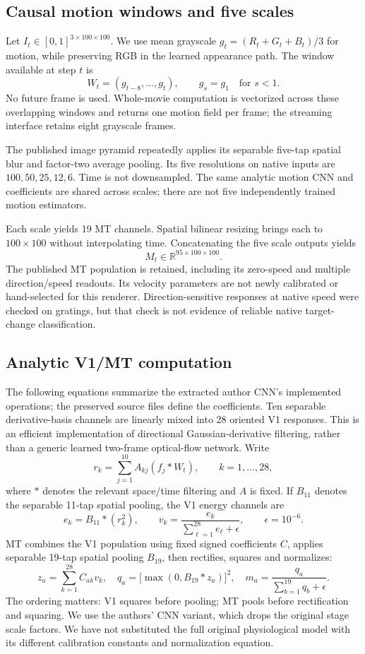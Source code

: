 \documentclass[11pt]{article}
\begin{document}
\subsection{Causal motion windows and five scales}

Let $I_t\in[0,1]^{3\times100\times100}$. We use mean grayscale $g_t=(R_t+G_t+B_t)/3$ for motion, while preserving RGB in the learned appearance path. The window available at step $t$ is
\[
  W_t=(g_{t-8},\ldots,g_t),\qquad g_s=g_1\quad\text{for }s<1.
\]
No future frame is used. Whole-movie computation is vectorized across these overlapping windows and returns one motion field per frame; the streaming interface retains eight grayscale frames.

The published image pyramid repeatedly applies its separable five-tap spatial blur and factor-two average pooling. Its five resolutions on native inputs are $100,50,25,12,6$. Time is not downsampled. The same analytic motion CNN and coefficients are shared across scales; there are not five independently trained motion estimators.

Each scale yields 19 MT channels. Spatial bilinear resizing brings each to $100\times100$ without interpolating time. Concatenating the five scale outputs yields
\[
 M_t\in\mathbb R^{95\times100\times100}.
\]
The published MT population is retained, including its zero-speed and multiple direction/speed readouts. Its velocity parameters are not newly calibrated or hand-selected for this renderer. Direction-sensitive responses at native speed were checked on gratings, but that check is not evidence of reliable native target-change classification.

\subsection{Analytic V1/MT computation}

The following equations summarize the extracted author CNN's implemented operations; the preserved source files define the coefficients. Ten separable derivative-basis channels are linearly mixed into 28 oriented V1 responses. This is an efficient implementation of directional Gaussian-derivative filtering, rather than a generic learned two-frame optical-flow network. Write
\[
 r_k = \sum_{j=1}^{10} A_{kj}(f_j*W_t),\qquad k=1,\ldots,28,
\]
where $*$ denotes the relevant space/time filtering and $A$ is fixed. If $B_{11}$ denotes the separable 11-tap spatial pooling, the V1 energy channels are
\[
 e_k=B_{11}*(r_k^2),\qquad
 v_k=\frac{e_k}{\sum_{\ell=1}^{28}e_\ell+\epsilon},\qquad \epsilon=10^{-6}.
\]
MT combines the V1 population using fixed signed coefficients $C$, applies separable 19-tap spatial pooling $B_{19}$, then rectifies, squares and normalizes:
\[
 z_a=\sum_{k=1}^{28}C_{ak}v_k,\quad
 q_a=\bigl[\max(0,B_{19}*z_a)\bigr]^2,\quad
 m_a=\frac{q_a}{\sum_{b=1}^{19}q_b+\epsilon}.
\]
The ordering matters: V1 squares before pooling; MT pools before rectification and squaring. We use the authors' CNN variant, which drops the original stage scale factors. We have not substituted the full original physiological model with its different calibration constants and normalization equation.
\end{document}
